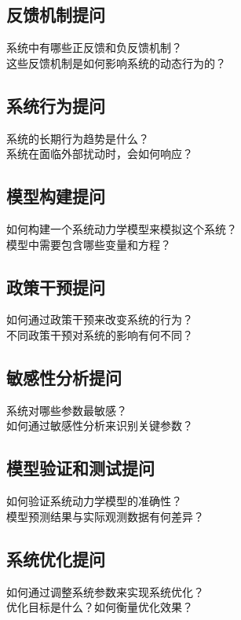 \documentclass[12pt]{book}
\begin{document}
\subsection{反馈机制提问}
系统中有哪些正反馈和负反馈机制？\\
这些反馈机制是如何影响系统的动态行为的？\\

\subsection{系统行为提问}
系统的长期行为趋势是什么？\\
系统在面临外部扰动时，会如何响应？\\

\subsection{模型构建提问}
如何构建一个系统动力学模型来模拟这个系统？\\
模型中需要包含哪些变量和方程？\\

\subsection{政策干预提问}
如何通过政策干预来改变系统的行为？\\
不同政策干预对系统的影响有何不同？\\

\subsection{敏感性分析提问}
系统对哪些参数最敏感？\\
如何通过敏感性分析来识别关键参数？\\

\subsection{模型验证和测试提问}
如何验证系统动力学模型的准确性？\\
模型预测结果与实际观测数据有何差异？\\

\subsection{系统优化提问}
如何通过调整系统参数来实现系统优化？\\
优化目标是什么？如何衡量优化效果？\\
\end{document}
